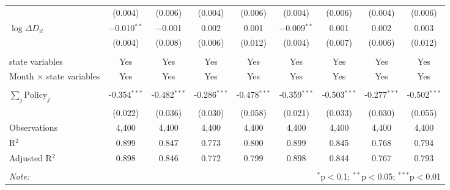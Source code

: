 \begin{tabular}{@{\extracolsep{1pt}}lcccccccc}
  & (0.004) & (0.006) & (0.004) & (0.006) & (0.004) & (0.006) & (0.004) & (0.006) \\ 
  $\log \Delta D_{it}$ & $-$0.010$^{**}$ & $-$0.001 & 0.002 & 0.001 & $-$0.009$^{**}$ & 0.001 & 0.002 & 0.003 \\ 
  & (0.004) & (0.008) & (0.006) & (0.012) & (0.004) & (0.007) & (0.006) & (0.012) \\ 
 \hline \\[-1.8ex] 
state variables & Yes & Yes & Yes & Yes & Yes & Yes & Yes & Yes \\ 
Month $\times$ state variables & Yes & Yes & Yes & Yes & Yes & Yes & Yes & Yes \\ 
\hline \\[-1.8ex] 
$\sum_j \mathrm{Policy}_j$ & -0.354$^{***}$ & -0.482$^{***}$ & -0.286$^{***}$ & -0.478$^{***}$ & -0.359$^{***}$ & -0.503$^{***}$ & -0.277$^{***}$ & -0.502$^{***}$ \\ 
 & (0.022) & (0.036) & (0.030) & (0.058) & (0.021) & (0.033) & (0.030) & (0.055) \\ 
Observations & 4,400 & 4,400 & 4,400 & 4,400 & 4,400 & 4,400 & 4,400 & 4,400 \\ 
R$^{2}$ & 0.899 & 0.847 & 0.773 & 0.800 & 0.899 & 0.845 & 0.768 & 0.794 \\ 
Adjusted R$^{2}$ & 0.898 & 0.846 & 0.772 & 0.799 & 0.898 & 0.844 & 0.767 & 0.793 \\ 
\hline 
\hline \\[-1.8ex] 
\textit{Note:}  & \multicolumn{8}{r}{$^{*}$p$<$0.1; $^{**}$p$<$0.05; $^{***}$p$<$0.01} \\ 
\end{tabular} 